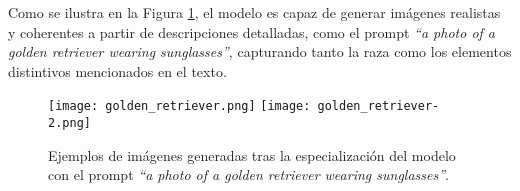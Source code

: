 Como se ilustra en la Figura \ref{fig:latent-space-optimization}, el modelo es capaz de generar imágenes realistas y coherentes a partir de descripciones detalladas, como el prompt \textit{``a photo of a golden retriever wearing sunglasses''}, capturando tanto la raza como los elementos distintivos mencionados en el texto.

\begin{figure}[H]
\centering
\texttt{[image: golden\_retriever.png]}
\hfill
\texttt{[image: golden\_retriever-2.png]}
\caption{Ejemplos de imágenes generadas tras la especialización del modelo con el prompt \textit{``a photo of a golden retriever wearing sunglasses''}.}
\label{fig:latent-space-optimization}
\end{figure}

